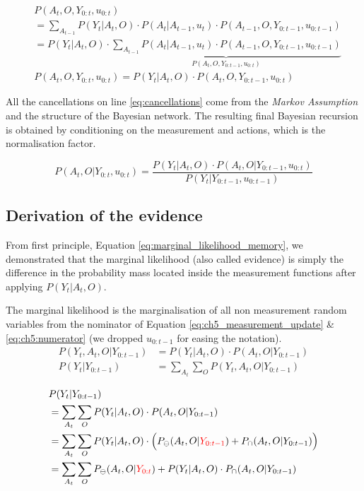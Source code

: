 \begin{align}
  &P(A_t,O,Y_{0:t},u_{0:t}) \\
  &= \sum_{A_{t-1}} P(Y_t|A_{t},O) \cdot P(A_t|A_{t-1},u_{t}) \cdot P(A_{t-1},O,Y_{0:t-1},u_{0:t-1}) \nonumber \\
  &= P(Y_t|A_{t},O) \cdot \underbrace{\sum_{A_{t-1}} P(A_t|A_{t-1},u_t) \cdot P(A_{t-1},O,Y_{0:t-1},u_{0:t-1})}_{P(A_t,O,Y_{0:t-1},u_{0:t})} \\
  &P(A_t,O,Y_{0:t},u_{0:t}) = P(Y_t|A_{t},O) \cdot P(A_t,O,Y_{0:t-1},u_{0:t})
\end{align}

All the cancellations on line \ref{eq:cancellations} come from the \textit{Markov Assumption} and the structure of the Bayesian network.
The resulting final Bayesian recursion is obtained by conditioning on the measurement and actions, which is the normalisation factor.

\begin{equation}\label{eq:ch5_measurement_update}
 P(A_t,O|Y_{0:t},u_{0:t}) = \frac{P(Y_t|A_{t},O) \cdot P(A_{t},O|Y_{0:t-1},u_{0:t})}{P(Y_t|Y_{0:t-1},u_{0:t-1})}
\end{equation}


\subsection{Derivation of the evidence}\label{appendix:evidence}

From first principle, Equation \ref{eq:marginal_likelihood_memory}, we demonstrated that the marginal likelihood (also called evidence) is simply the difference
in the probability mass located inside the measurement functions after applying $P(Y_t|A_t,O)$.

The marginal likelihood is the marginalisation of all non measurement random variables from 
the nominator of Equation \ref{eq:ch5_measurement_update} \& \ref{eq:ch5:numerator} (we dropped $u_{0:t-1}$ for easing the notation).
\begin{align}\label{eq:ch5:numerator}
  P(Y_t,A_t,O|Y_{0:t-1}) &= P(Y_t|A_t,O) \cdot P(A_t,O|Y_{0:t-1})\\ 
 P(Y_t|Y_{0:t-1}) &= \sum\limits_{A_t}\sum\limits_{O} P(Y_t,A_t,O|Y_{0:t-1})  \label{eq:marginal_likelihood_memory}  
\end{align}
 
\begin{align}
 &P(Y_t|Y_{0:t-1}) \\ 
		  &= \sum\limits_{A_t}\sum\limits_{O} P(Y_t|A_t,O)\cdot P(A_t,O|Y_{0:t-1}) \\
		  &= \sum\limits_{A_t}\sum\limits_{O} P(Y_t|A_t,O)\cdot \Big(P_{\ominus}(A_t,O|{\color{red}Y_{0:t-1}}) + P_{\cap}(A_t,O|Y_{0:t-1})\Big)\\
		  &= \sum\limits_{A_t}\sum\limits_{O} P_{\ominus}(A_t,O|{\color{red}Y_{0:t}}) + P(Y_t|A_t,O)\cdot P_{\cap}(A_t,O|Y_{0:t-1}) \label{eq:marginal_likelihood_memory_last}
\end{align}

